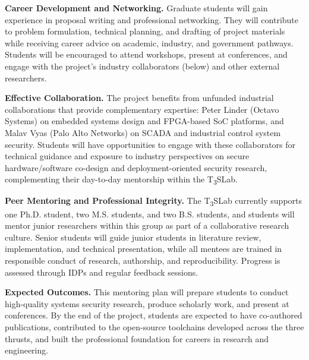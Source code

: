 \documentclass[11pt,onecolumn]{article}
\begin{document}
\textbf{Career Development and Networking.} Graduate students will gain experience in proposal writing and professional networking. They will contribute to problem formulation, technical planning, and drafting of project materials while receiving career advice on academic, industry, and government pathways. Students will be encouraged to attend workshops, present at conferences, and engage with the project's industry collaborators (below) and other external researchers.

\textbf{Effective Collaboration.} The project benefits from unfunded industrial collaborations that provide complementary expertise: Peter Linder (Octavo Systems) on embedded systems design and FPGA-based SoC platforms, and Malav Vyas (Palo Alto Networks) on SCADA and industrial control system security. Students will have opportunities to engage with these collaborators for technical guidance and exposure to industry perspectives on secure hardware/software co-design and deployment-oriented security research, complementing their day-to-day mentorship within the T\textsubscript{3}SLab.

\textbf{Peer Mentoring and Professional Integrity.} The T\textsubscript{3}SLab currently supports one Ph.D. student, two M.S. students, and two B.S. students, and students will mentor junior researchers within this group as part of a collaborative research culture. Senior students will guide junior students in literature review, implementation, and technical presentation, while all mentees are trained in responsible conduct of research, authorship, and reproducibility. Progress is assessed through IDPs and regular feedback sessions.

\textbf{Expected Outcomes.} This mentoring plan will prepare students to conduct high-quality systems security research, produce scholarly work, and present at conferences. By the end of the project, students are expected to have co-authored publications, contributed to the open-source toolchains developed across the three thrusts, and built the professional foundation for careers in research and engineering.
\end{document}
